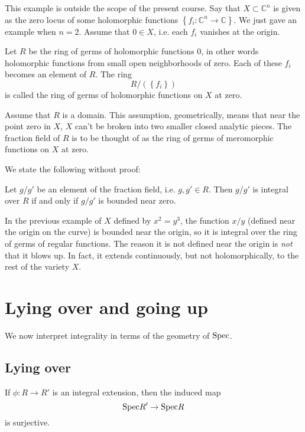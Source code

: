 \begin{example}
This example is outside the scope of the present course.  Say that $X \subset
\mathbb{C}^n$ is given as the zero locus of some holomorphic functions
$\left\{f_i: \mathbb{C}^{n} \to \mathbb{C}\right\}$.  We just gave an example
when $n=2$.
Assume that $0 \in X$, i.e. each $f_i$ vanishes at the origin.  

Let $R$ be the ring of germs of holomorphic functions $0$, in other words
holomorphic functions from small open neighborhoods of zero.  Each of these
$f_i$ becomes an  element of $R$.  The ring
\[ R/(\left\{f_i\right\} ) \]
is called the ring of germs of holomorphic functions on $X$ at zero. 

Assume that $R$ is a domain.  This assumption, geometrically, means that near
the point zero in $X$, $X$ can't be broken into two smaller closed analytic
pieces.  The fraction field of $R$ is to be thought of as the ring of
germs of meromorphic functions on $X$ at zero.

We state the following without proof:

\begin{theorem} 
Let $g/g'$ be an element of the fraction field, i.e. $g, g' \in R$. Then $g/g'$
is integral over $R$ if and only if $g/g'$ is bounded near zero. 
\end{theorem} 

In the previous example of $X$ defined by $x^2 = y^3$, the function $x/y$
(defined near the origin on the curve) is
bounded near the origin, so it is integral over the ring of germs of regular
functions. The reason it is not defined near the origin is \emph{not} that it
blows up. In fact, it extends continuously, but not holomorphically, to the
rest of the variety $X$. 
\end{example} 

\section{Lying over and going up}
We now interpret integrality in terms of the geometry of $\mathrm{Spec}$. 


\subsection{Lying over}

\begin{proposition}
If $\phi: R \to R'$ is an integral extension, then the induced map
\[ \mathrm{Spec} R' \to \mathrm{Spec} R  \]
is surjective.
\end{proposition} 


